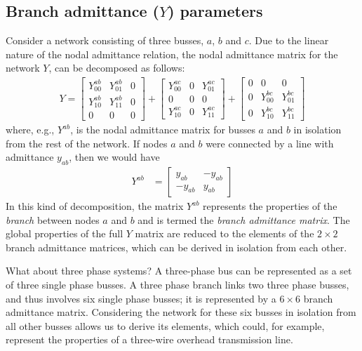 \documentclass[11pt]{article}
\begin{document}
\subsection{Branch admittance ($Y$) parameters}
Consider a network consisting of three busses, $a$, $b$ and $c$. Due to the linear nature of the nodal admittance relation, the nodal admittance matrix for the network $Y$, can be decomposed as follows:
\begin{align}
	Y = \begin{bmatrix}
		Y^{ab}_{00} & Y^{ab}_{01} & 0 \\ Y^{ab}_{10} & Y^{ab}_{11} & 0 \\ 0 & 0 & 0
	\end{bmatrix} + \begin{bmatrix}
		Y^{ac}_{00} & 0 & Y^{ac}_{01} \\ 0 & 0 & 0 \\ Y^{ac}_{10} & 0 &  Y^{ac}_{11}
	\end{bmatrix} + \begin{bmatrix}
		0 & 0 & 0 \\ 0 & Y^{bc}_{00} & Y^{bc}_{01} \\ 0 & Y^{bc}_{10} &  Y^{bc}_{11}
	\end{bmatrix}
	\label{EQ_BRANCH_DECOMP}
\end{align}
where, e.g., $Y^{ab}$, is the nodal admittance matrix for busses $a$ and $b$ in isolation from the rest of the network. If nodes $a$ and $b$ were connected by a line with admittance $y_{ab}$, then we would have
\begin{align}
	Y^{ab} &= 
	\begin{bmatrix}
		y_{ab} & -y_{ab} \\
		-y_{ab} & y_{ab}
	\end{bmatrix}
\end{align}
In this kind of decomposition, the matrix $Y^{ab}$ represents the properties of the \emph{branch} between nodes $a$ and $b$ and is termed the \emph{branch admittance matrix}. The global properties of the full $Y$ matrix are reduced to the elements of the $2 \times 2$ branch admittance matrices, which can be derived in isolation from each other.

What about three phase systems? A three-phase bus can be represented as a set of three single phase busses. A three phase branch links two three phase busses, and thus involves six single phase busses; it is represented by a $6 \times 6$ branch admittance matrix. Considering the network for these six busses in isolation from all other busses allows us to derive its elements, which could, for example, represent the properties of a three-wire overhead transmission line.
\end{document}
